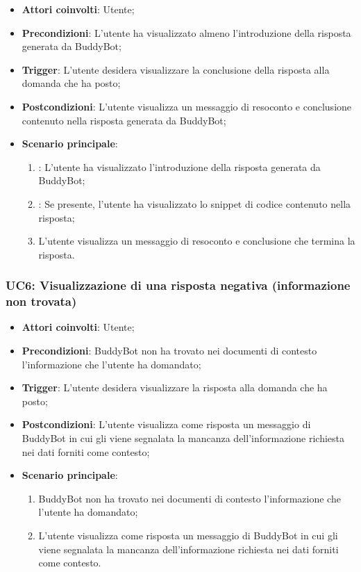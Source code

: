 \hypertarget{UC5.3}{}

\begin{itemize}
    \item \textbf{Attori coinvolti}: Utente;
    \item \textbf{Precondizioni}: L'utente ha visualizzato almeno l'introduzione della risposta generata da BuddyBot;
    \item \textbf{Trigger}: L'utente desidera visualizzare la conclusione della risposta alla domanda che ha posto;
    \item \textbf{Postcondizioni}: L'utente visualizza un messaggio di resoconto e conclusione contenuto nella risposta generata da BuddyBot;
    \item \textbf{Scenario principale}:
    \begin{enumerate}
        \item {}: L'utente ha visualizzato l'introduzione della risposta generata da BuddyBot;
        \item {}: Se presente, l'utente ha visualizzato lo snippet di codice contenuto nella risposta;
        \item L'utente visualizza un messaggio di resoconto e conclusione che termina la risposta.
    \end{enumerate}
\end{itemize}



\hypertarget{UC6}{}
\subsubsection{UC6: Visualizzazione di una risposta negativa (informazione non trovata)}

\begin{itemize}
    \item \textbf{Attori coinvolti}: Utente;
    \item \textbf{Precondizioni}: BuddyBot non ha trovato nei documenti di contesto l'informazione che l'utente ha domandato;
    \item \textbf{Trigger}: L'utente desidera visualizzare la risposta alla domanda che ha posto;
    \item \textbf{Postcondizioni}: L'utente visualizza come risposta un messaggio di BuddyBot in cui gli viene segnalata la mancanza dell'informazione 
    richiesta nei dati forniti come contesto;
    \item \textbf{Scenario principale}:
    \begin{enumerate}
        \item BuddyBot non ha trovato nei documenti di contesto l'informazione che l'utente ha domandato;
        \item L'utente visualizza come risposta un messaggio di BuddyBot in cui gli viene segnalata la mancanza dell'informazione richiesta 
        nei dati forniti come contesto.
    \end{enumerate}
\end{itemize}






